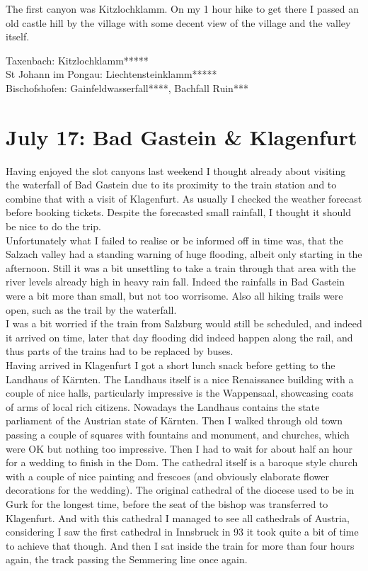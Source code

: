 {The first canyon was Kitzlochklamm. On my 1 hour hike to get there I passed an old castle hill by the village with some decent view of the village and the valley itself.

Taxenbach: Kitzlochklamm*****\\
St Johann im Pongau: Liechtensteinklamm*****\\
Bischofshofen: Gainfeldwasserfall****, Bachfall Ruin***

\section{July 17: Bad Gastein \& Klagenfurt}
\label{2021GasteinKlagenfurt}

Having enjoyed the slot canyons last weekend I thought already about visiting the waterfall of Bad Gastein due to its proximity to the train station and to combine that with a visit of Klagenfurt. As usually I checked the weather forecast before booking tickets. Despite the forecasted small rainfall, I thought it should be nice to do the trip.\\

Unfortunately what I failed to realise or be informed off in time was, that the Salzach valley had a standing warning of huge flooding, albeit only starting in the afternoon. Still it was a bit unsettling to take a train through that area with the river levels already high in heavy rain fall. Indeed the rainfalls in Bad Gastein were a bit more than small, but not too worrisome. Also all hiking trails were open, such as the trail by the waterfall.\\

I was a bit worried if the train from Salzburg would still be scheduled, and indeed it arrived on time, later that day flooding did indeed happen along the rail, and thus parts of the trains had to be replaced by buses.\\
Having arrived in Klagenfurt I got a short lunch snack before getting to the Landhaus of K\"arnten. The Landhaus itself is a nice Renaissance building with a couple of nice halls, particularly impressive is the Wappensaal, showcasing coats of arms of local rich citizens. Nowadays the Landhaus contains the state parliament of the Austrian state of K\"arnten. Then I walked through old town passing a couple of squares with fountains and monument, and churches, which were OK but nothing too impressive. Then I had to wait for about half an hour for a wedding to finish in the Dom. The cathedral itself is a baroque style church with a couple of nice painting and frescoes (and obviously elaborate flower decorations for the wedding). The original cathedral of the diocese used to be in Gurk for the longest time, before the seat of the bishop was transferred to Klagenfurt. And with this cathedral I managed to see all cathedrals of Austria, considering I saw the first cathedral in Innsbruck in 93 it took quite a bit of time to achieve that though. And then I sat inside the train for more than four hours again, the track passing the Semmering line once again.\\

}
